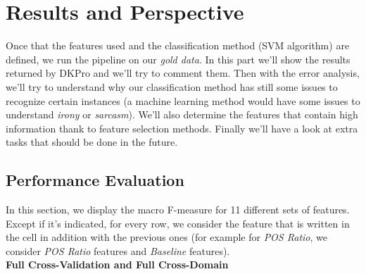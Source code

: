 \chapter{Results and Perspective}
Once that the features used and the classification method (SVM algorithm) are defined, we run the pipeline on our \emph{gold data}. In this part we'll show the results returned by DKPro and we'll try to comment them. Then with the error analysis, we'll try to understand why our classification method has still some issues to recognize certain instances (a machine learning method would have some issues to understand \emph{irony} or \emph{sarcasm}). We'll also determine the features that contain high information thank to feature selection methods. Finally we'll have a look at extra tasks that should be done in the future.
\section{Performance Evaluation}
In this section, we display the macro F-measure for 11 different sets of features. Except if it's indicated, for every row, we consider the feature that is written in the cell in addition with the previous ones (for example for \emph{POS Ratio}, we consider \emph{POS Ratio} features and \emph{Baseline} features).
\\
\textbf{Full Cross-Validation and Full Cross-Domain}
